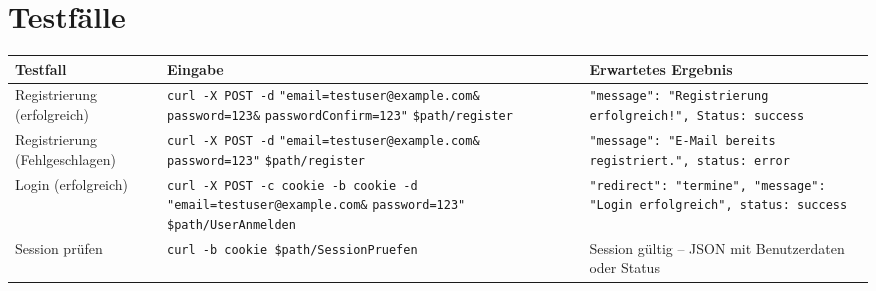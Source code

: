 \section*{Testfälle}

\FloatBarrier %

\begin{table}[H] %
    \centering
    \scriptsize
    \renewcommand{\arraystretch}{1.2}
    \begin{tabular}{|p{3cm}|p{7.9cm}|p{6.7cm}|}
        \hline
        \textbf{Testfall} & \textbf{Eingabe} & \textbf{Erwartetes Ergebnis} \\ \hline

        Registrierung (erfolgreich) &
        \parbox{6cm}{
          \texttt{curl -X POST -d} \\
          \texttt{"email=testuser@example.com\&} \\
          \texttt{password=123\&} \\
          \texttt{passwordConfirm=123"} \\
          \texttt{\$path/register}
        } &
        \texttt{"message": "Registrierung erfolgreich!", Status: success} \\ \hline

        Registrierung (Fehlgeschlagen) &
        \parbox{6cm}{
          \texttt{curl -X POST -d} \\
          \texttt{"email=testuser@example.com\&} \\
          \texttt{password=123"} \\
          \texttt{\$path/register}
        } &
        \texttt{"message": "E-Mail bereits registriert.", status: error} \\ \hline

        Login (erfolgreich) &
        \parbox{6cm}{
          \texttt{curl -X POST -c cookie -b cookie -d} \\
          \texttt{"email=testuser@example.com\&} \\
          \texttt{password=123"} \\
          \texttt{\$path/UserAnmelden}
        } &
        \texttt{"redirect": "termine", "message": "Login erfolgreich", status: success} \\ \hline

        Session prüfen &
        \parbox{6cm}{
          \texttt{curl -b cookie \$path/SessionPruefen}
        } &
        Session gültig – JSON mit Benutzerdaten oder Status \\ \hline


\end{tabular}
\end{table}
